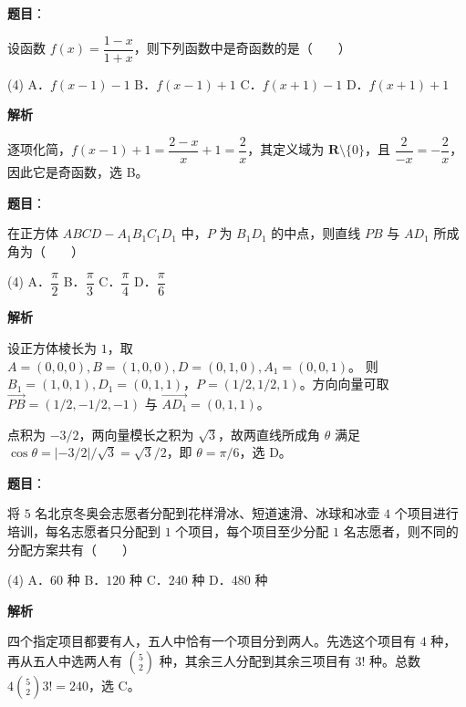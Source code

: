 \begin{answer}

\textbf{题目}：

设函数 $f(x)=\dfrac{1-x}{1+x}$，则下列函数中是奇函数的是\mbox{（　　）}

\begin{gkopts}(4)
\task A．$f(x-1)-1$
\task B．$f(x-1)+1$
\task C．$f(x+1)-1$
\task D．$f(x+1)+1$
\end{gkopts}

\textbf{解析}

逐项化简，$f(x-1)+1=\dfrac{2-x}{x}+1=\dfrac2x$，其定义域为 $\mathbf R\setminus\{0\}$，且 $\dfrac2{-x}=-\dfrac2x$，因此它是奇函数，选 B。


\end{answer}
\begin{answer}

\textbf{题目}：

在正方体 $ABCD-A_1B_1C_1D_1$ 中，$P$ 为 $B_1D_1$ 的中点，则直线 $PB$ 与 $AD_1$ 所成角为\mbox{（　　）}

\begin{gkopts}(4)
\task A．$\dfrac{\pi}{2}$
\task B．$\dfrac{\pi}{3}$
\task C．$\dfrac{\pi}{4}$
\task D．$\dfrac{\pi}{6}$
\end{gkopts}

\textbf{解析}

设正方体棱长为 $1$，取
$A=(0,0,0),B=(1,0,0),D=(0,1,0),A_1=(0,0,1)$。
则 $B_1=(1,0,1),D_1=(0,1,1)$，$P=(1/2,1/2,1)$。方向向量可取
$\overrightarrow{PB}=(1/2,-1/2,-1)$ 与 $\overrightarrow{AD_1}=(0,1,1)$。

点积为 $-3/2$，两向量模长之积为 $\sqrt3$，故两直线所成角 $\theta$ 满足 $\cos\theta=|{-3/2}|/\sqrt3=\sqrt3/2$，即 $\theta=\pi/6$，选 D。


\end{answer}
\begin{answer}

\textbf{题目}：

将 $5$ 名北京冬奥会志愿者分配到花样滑冰、短道速滑、冰球和冰壶 $4$ 个项目进行培训，每名志愿者只分配到 $1$ 个项目，每个项目至少分配 $1$ 名志愿者，则不同的分配方案共有\mbox{（　　）}

\begin{gkopts}(4)
\task A．$60$ 种
\task B．$120$ 种
\task C．$240$ 种
\task D．$480$ 种
\end{gkopts}

\textbf{解析}

四个指定项目都要有人，五人中恰有一个项目分到两人。先选这个项目有 $4$ 种，再从五人中选两人有 $\binom52$ 种，其余三人分配到其余三项目有 $3!$ 种。总数
$4\binom52 3!=240$，选 C。


\end{answer}
